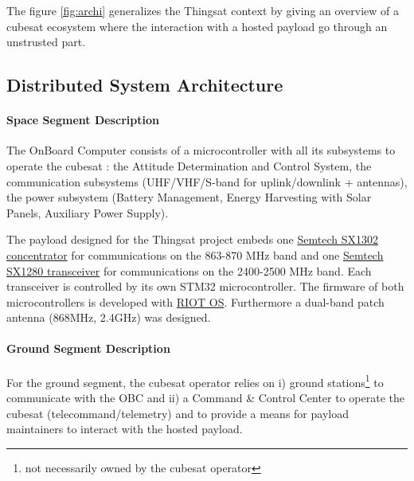 
The figure \ref{fig:archi} generalizes the Thingsat context by giving an
overview of a cubesat ecosystem where the interaction with a hosted payload go
through an unstrusted part.

\subsection{Distributed System Architecture}

\paragraph*{Space Segment Description}

The OnBoard Computer consists of a microcontroller with all its subsystems to
operate the cubesat : the Attitude Determination and Control System, the
communication subsystems (UHF/VHF/S-band for uplink/downlink + antennas),
the power subsystem (Battery Management, Energy Harvesting with Solar Panels,
Auxiliary Power Supply). 

The payload designed for the Thingsat project embeds one
\href{https://www.semtech.com/products/wireless-rf/lora-gateways/sx1302}{Semtech
SX1302 concentrator} for communications on the 863-870 MHz band and one
\href{https://www.semtech.com/products/wireless-rf/24-ghz-transceivers/sx1280}{Semtech
SX1280 transceiver} for communications on the 2400-2500 MHz band. Each
transceiver is controlled by its own STM32 microcontroller. The firmware of both
microcontrollers is developed with \href{https://github.com/RIOT-OS/RIOT}{RIOT
OS}. Furthermore a dual-band patch antenna (868MHz, 2.4GHz) was designed.

\paragraph*{Ground Segment Description}

For the ground segment, the cubesat operator relies on i) ground
stations\footnote{not necessarily owned by the cubesat operator} to communicate
with the OBC and ii) a Command \& Control Center to operate the cubesat
(telecommand/telemetry) and to provide a means for payload maintainers to
interact with the hosted payload.


